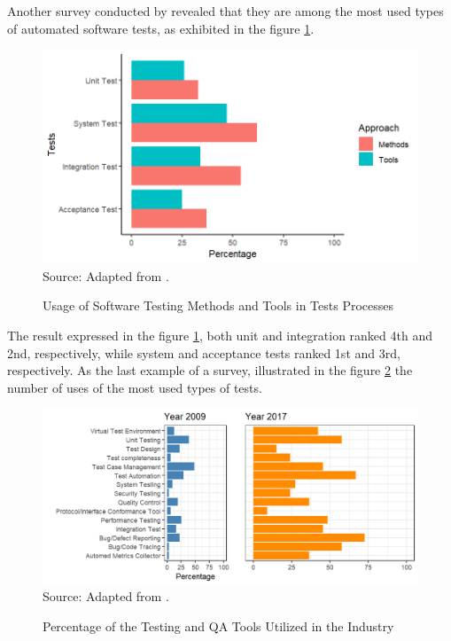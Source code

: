 Another survey conducted by \cite{lee2012survey} revealed that they are among the most used types of automated software tests, as exhibited in the figure \ref{fig:usage_stmt_tests_processes}.

\begin{figure}[H]
    \centering
    \caption{Usage of Software Testing Methods and Tools in Tests Processes}
    \includegraphics[width=0.8\linewidth]{figures/tests/usage_stmt_tests_processes.png}
    \label{fig:usage_stmt_tests_processes}
    \\ \footnotesize Source: Adapted from \cite{lee2012survey}.
\end{figure}

The result expressed in the figure \ref{fig:usage_stmt_tests_processes}, both unit and integration ranked 4th and 2nd, respectively, while system and acceptance tests ranked 1st and 3rd, respectively. As the last example of a survey, \cite{hynninen2023development} illustrated in the figure \ref{fig:testing_tools_2017_2009} the number of uses of the most used types of tests.

\begin{figure}[H]
    \centering
    \caption{Percentage of the Testing and QA Tools Utilized in the Industry}
    \includegraphics[width=0.8\linewidth]{figures/tests/testing_tools_2017_2009.png}
    \label{fig:testing_tools_2017_2009}
    \\ \footnotesize Source: Adapted from \cite{hynninen2023development, kasurinen2010software}.
\end{figure}

